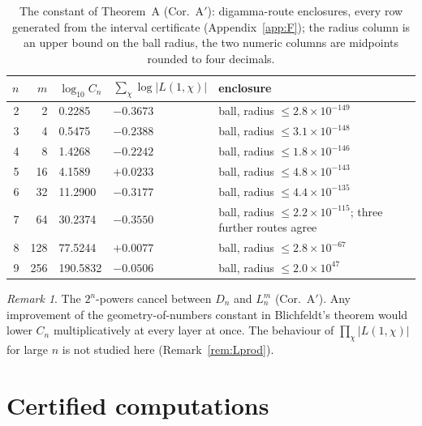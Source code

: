 \documentclass[11pt]{amsart}
\theoremstyle{remark}\newtheorem{remark}[theorem]{Remark}
\theoremstyle{definition}\newtheorem{definition}[theorem]{Definition}
\begin{document}
\begin{table}[h]\footnotesize
\begin{tabular}{@{}rrllp{5.6cm}@{}}\toprule
$n$ & $m$ & $\log_{10}C_n$ & $\sum_\chi\log|L(1,\chi)|$ & enclosure\\ \midrule
2 & 2 & 0.2285 & $-0.3673$ & ball, radius $\le2.8\times10^{-149}$\\
3 & 4 & 0.5475 & $-0.2388$ & ball, radius $\le3.1\times10^{-148}$\\
4 & 8 & 1.4268 & $-0.2242$ & ball, radius $\le1.8\times10^{-146}$\\
5 & 16 & 4.1589 & $+0.0233$ & ball, radius $\le4.8\times10^{-143}$\\
6 & 32 & 11.2900 & $-0.3177$ & ball, radius $\le4.4\times10^{-135}$\\
7 & 64 & 30.2374 & $-0.3550$ & ball, radius $\le2.2\times10^{-115}$; three further routes agree\\
8 & 128 & 77.5244 & $+0.0077$ & ball, radius $\le2.8\times10^{-67}$\\
9 & 256 & 190.5832 & $-0.0506$ & ball, radius $\le2.0\times10^{47}$\\
\bottomrule\end{tabular}
\caption{The constant of Theorem~A (Cor.~A$'$): digamma-route enclosures, every row generated from the interval certificate (Appendix~\ref{app:F}); the radius column is an upper bound on the ball radius, the two numeric columns are midpoints rounded to four decimals.}\label{tab:Cn}
\end{table}
\begin{remark}
The $2^n$-powers cancel between $D_n$ and $L_n^m$ (Cor.~A$'$). Any improvement of the geometry-of-numbers constant in Blichfeldt's theorem would lower $C_n$ multiplicatively at every layer at once. The behaviour of $\prod_\chi|L(1,\chi)|$ for large $n$ is not studied here (Remark~\ref{rem:Lprod}).
\end{remark}

\section{Certified computations}\label{sec:cert}
\end{document}
